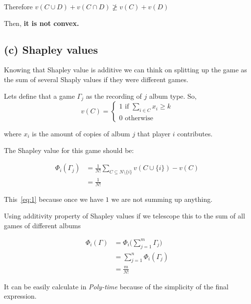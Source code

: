 \documentclass[12pt, a4paper]{article}
\begin{document}
Therefore $v(C \cup D) + v(C \cap D) \ngeq v(C) + v(D)$

Then, \textbf{it is not convex.}

\subsection{(c) Shapley values}
Knowing that Shapley value is additive we can think on splitting up the game as the sum of several
Shaply values if they were different games. 

Lets define that a game $\Gamma_j$ as the recording of $j$ album type. So,
\[
  v(C) = \begin{cases}
    1 \text{ if } \sum_{i \in C} x_i \geq k\\
    0 \text{ otherwise}
  \end{cases}
  \]

where $x_i$ is the amount of copies of album $j$ that player $i$ contributes.

The Shapley value for this game should be:

\begin{subequations}
  \begin{align}    
    \Phi_i(\Gamma_j) &= \frac{1}{N!} \sum_{C \subseteq N \setminus \{i\}} v(C \cup \{i\}) - v(C)\\
                     &= \frac{1}{N!}\label{eq:1}
  \end{align}
\end{subequations}

This~\ref{eq:1} because once we have $1$ we are not summing up anything.

Using additivity property of Shapley values if we telescope this to the sum of all games of different albums

\begin{subequations}
  \begin{align}    
  \Phi_i(\Gamma) &= \Phi_i\bigr(\sum_{j=1}^m \Gamma_j\bigl)\\
                 &= \sum_{j=1}^n \Phi_i(\Gamma_j)\\
                 &= \frac{m}{N!}
\end{align}
\end{subequations}

It can be easily calculate in \textit{Poly-time} because of the simplicity of the final expression.
\end{document}
